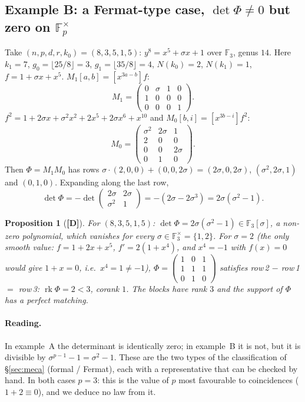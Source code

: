 \documentclass[11pt,a4paper]{article}
\newtheorem{proposition}[theorem]{Proposition}
\newcommand{\F}{\mathbb{F}}
\begin{document}
\subsection*{Example B: a Fermat-type case, $\det\Phi\neq0$ but zero on $\F_p^\times$}

Take $(n,p,d,r,k_0)=(8,3,5,1,5)$: $y^8=x^5+\sigma x+1$ over $\F_3$, genus $14$.
Here $k_1=7$, $g_0=\lfloor25/8\rfloor=3$, $g_1=\lfloor35/8\rfloor=4$,
$N(k_0)=2$, $N(k_1)=1$, $f=1+\sigma x+x^5$. $M_1[a,b]=[x^{3a-b}]f$:
$$M_1=\begin{pmatrix}0&\sigma&1&0\\1&0&0&0\\0&0&0&1\end{pmatrix}.$$
$f^2=1+2\sigma x+\sigma^2x^2+2x^5+2\sigma x^6+x^{10}$ and $M_0[b,i]=[x^{3b-i}]f^2$:
$$M_0=\begin{pmatrix}\sigma^2&2\sigma&1\\2&0&0\\0&0&2\sigma\\0&1&0\end{pmatrix}.$$
Then $\Phi=M_1M_0$ has rows $\sigma\cdot(2,0,0)+(0,0,2\sigma)=(2\sigma,0,2\sigma)$,
$(\sigma^2,2\sigma,1)$ and $(0,1,0)$. Expanding along the last row,
$$\det\Phi=-\det\begin{pmatrix}2\sigma&2\sigma\\\sigma^2&1\end{pmatrix}
=-(2\sigma-2\sigma^3)=2\sigma(\sigma^2-1).$$

\begin{proposition}[\textbf{[D]}]
\label{prop:exB}
For $(8,3,5,1,5)$: $\det\Phi=2\sigma(\sigma^2-1)\in\F_3[\sigma]$, a \emph{non-zero}
polynomial, which vanishes for every $\sigma\in\F_3^\times=\{1,2\}$. For
$\sigma=2$ (the only smooth value: $f=1+2x+x^5$, $f'=2(1+x^4)$, and $x^4=-1$ with
$f(x)=0$ would give $1+x=0$, i.e.\ $x^4=1\neq-1$),
$\Phi=\begin{pmatrix}1&0&1\\1&1&1\\0&1&0\end{pmatrix}$ satisfies row\,2 $-$ row\,1 $=$
row\,3: $\operatorname{rk}\Phi=2<3$, corank $1$. The blocks have rank $3$ and the
support of $\Phi$ has a perfect matching.
\end{proposition}

\paragraph{Reading.} In example~A the determinant is identically zero; in
example~B it is not, but it is divisible by $\sigma^{p-1}-1=\sigma^2-1$. These
are the two types of the classification of \S\ref{sec:meca} (formal / Fermat),
each with a representative that can be checked by hand. In both cases $p=3$: this
is the value of $p$ most favourable to coincidences ($1+2\equiv0$), and we deduce
no law from it.
\end{document}
